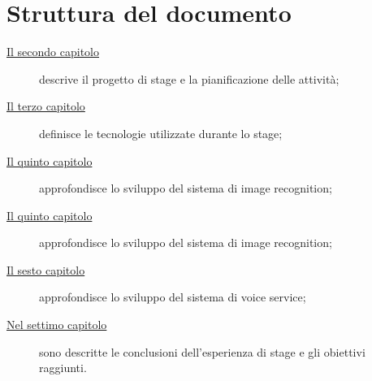 \section{Struttura del documento}

	\begin{description}
	    \item[{\hyperref[cap:descrizione-stage]{Il secondo capitolo}}] descrive il progetto di stage e la pianificazione delle attività;
	    
		\item[{\hyperref[cap:tecnologie]{Il terzo capitolo}}] definisce le tecnologie utilizzate durante lo stage;
		
		\item[{\hyperref[cap:applicazione]{Il quinto capitolo}}] approfondisce lo sviluppo del sistema di image recognition;
	    
	    \item[{\hyperref[cap:rekognition]{Il quinto capitolo}}] approfondisce lo sviluppo del sistema di image recognition;
	    
	    \item[{\hyperref[cap:lex]{Il sesto capitolo}}] approfondisce lo sviluppo del sistema di voice service;
	   
	    \item[{\hyperref[cap:conclusioni]{Nel settimo capitolo}}] sono descritte le conclusioni dell'esperienza di stage e gli obiettivi raggiunti.
	\end{description}




